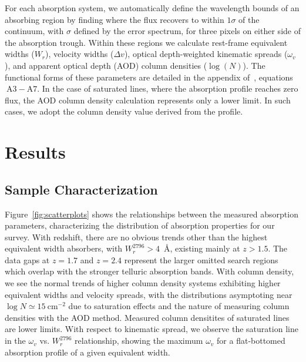\documentclass[iop,apj,numberedappendix,appendixfloats,twocolappendix]{emulateapj}
\begin{document}
For each absorption system, we automatically define the wavelength bounds of an absorbing region by finding where the flux recovers to within $1\sigma$ of the continuum, with $\sigma$ defined by the error spectrum, for three pixels on either side of the absorption trough. Within these regions we calculate rest-frame equivalent widths ($W_r$), velocity widths ($\Delta v$), optical depth-weighted kinematic spreads ($\omega_v$), and apparent optical depth (AOD) column densities ($\log(N)$). The functional forms of these parameters are detailed in the appendix of~\cite{Churchill2001}, equations$~\mathrm{A3 - A7}$. In the case of saturated lines, where the absorption profile reaches zero flux, the AOD column density calculation represents only a lower limit. In such cases, we adopt the column density value derived from the {} profile.


\section{Results}
\label{sec:results}


\subsection{Sample Characterization}
\label{sec:sample}

\begin{figure*}[bth]
\caption{Correlations between measured absorption properties for The Vulture Survey. $\log N$ is the ${\MgII}$ AOD column density, $\omega_v$ is the kinematic spread, $W_r^{2796}$ is the rest frame {} equivalent width, and $z$ is the absorption redshift.}
\label{fig:scatterplots}
\end{figure*}

Figure~\ref{fig:scatterplots} shows the relationships between the measured absorption parameters, characterizing the distribution of absorption properties for our survey. With redshift, there are no obvious trends other than the highest equivalent width absorbers, with $W_r^{2796} > 4$~{\AA}, existing mainly at $z > 1.5$. The data gaps at $z = 1.7$ and $z = 2.4$ represent the larger omitted search regions which overlap with the stronger telluric absorption bands. With column density, we see the normal trends of higher column density systems exhibiting higher equivalent widths and velocity spreads, with the distributions asymptoting near $\log N \simeq 15~\mathrm{cm^{-2}}$ due to saturation effects and the nature of measuring column densities with the AOD method. Measured column densitites of saturated lines are lower limits. With respect to kinematic spread, we observe the saturation line in the $\omega_v$ vs. $W_r^{2796}$ relationship, showing the maximum $\omega_v$ for a flat-bottomed absorption profile of a given equivalent width.
\end{document}
